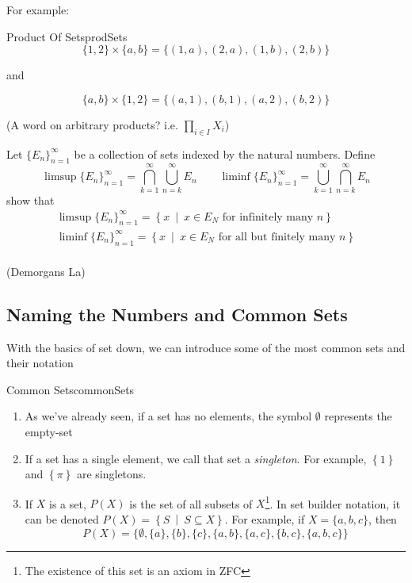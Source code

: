 \documentclass{book}
\newcommand{\sse}{\subseteq}
\newcommand{\set}[2]{\left\{#1 \ \middle|\ #2\right\}}
\begin{document}
For example:

\begin{example}{Product Of Sets}{prodSets}
\[
	\{1,2\} \times \{a,b\} = \{(1,a), (2,a), (1,b), (2,b)\}
\]
\begin{center}
	and
\end{center}
\[
	\{a,b\} \times \{1,2\} = \{(a,1), (b,1), (a,2), (b,2)\}
\]
\end{example}

(A word on arbitrary products? i.e. $\prod_{i \in I} X_i$)

\begin{Exercise}[label=ex:basicSetExercises]
	\Question Let $\{E_n\}_{n=1}^\infty$ be a collection of sets indexed by the natural numbers. Define
  \[
  	\limsup\{E_n\}_{n=1}^\infty = \bigcap_{k=1}^\infty \bigcup_{n=k}^\infty E_n \qquad \liminf \{E_n\}_{n=1}^\infty = \bigcup_{k=1}^\infty \bigcap_{n=k}^\infty E_n
  \]
  show that
  \begin{gather*}
  	\limsup \{E_n\}_{n=1}^\infty = \set{x}{x \in E_N\text{ for infinitely many $n$}}\\
  	\liminf \{E_n\}_{n=1}^\infty = \set{x}{x \in E_N\text{ for all but finitely many $n$}}\\
  \end{gather*}

  \Question (Demorgans La)
\end{Exercise}
\begin{Answer}[ref={ex:basicSetExercises}]
  \Question
\end{Answer}


\subsection*{Naming the Numbers and Common Sets}

With the basics of set down, we can introduce some of the most common sets and their notation
\begin{defn}{Common Sets}{commonSets}
	\begin{enumerate}
		\item As we've already seen, if a set has no elements, the symbol $\emptyset$ represents the empty-set
		\item If a set has a single element, we call that set a \emph{singleton}. For example, $\left\{ 1 \right\}$ and
			$\left\{ \pi \right\}$ are singletons.
		\item If $X$ is a set, $P(X)$ is the set of all subsets of $X$\footnote{The existence of this set is an axiom
			in ZFC}. In set builder notation, it can be denoted $P(X) = \set{S}{S \sse X}$. For example, if $X = \{a,b,c\}$, then
			\[
				P(X) = \{ \emptyset, \{a\}, \{b\}, \{c\}, \{a,b\}, \{a,c\}, \{b,c\}, \{a,b,c\}\}
			\]
		\end{enumerate}
\end{defn}
\end{document}
